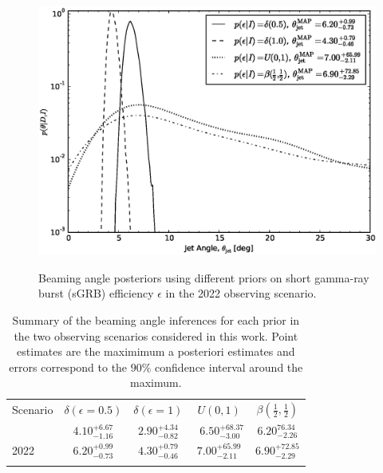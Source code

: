 \documentclass[twocolumn,nofootinbib]{revtex4-1}
\def\sgrb#1{short gamma-ray burst#1 (sGRB#1)\gdef\sgrb{sGRB}}
\begin{document}
\begin{figure}
\centering
{\includegraphics[width=\linewidth]{jet_angle_posterior_aligo_2022_re_real.eps}}
\caption{Beaming angle posteriors using different priors on \sgrb{} efficiency
$\epsilon$ in the 2022 observing scenario.\label{fig:jetposterior2022}}
\end{figure}

\begin{table}
\centering
\begin{tabular}{l c c c c }
\toprule
Scenario & $\delta(\epsilon=0.5)$ & $\delta(\epsilon=1)$ & $U(0,1)$ & $\beta(\frac{1}{2},\frac{1}{2})$\\
\cline{1-1}\cline{2-5}
\colrule
2016  & $4.10^{+6.67}_{-1.16}$ & $2.90^{+4.34}_{-0.82}$ &\ $6.50^{+68.37}_{-3.00}$ & $6.20^{76.34}_{-2.26}$ \\
2022 & $6.20^{+0.99}_{-0.73}$ & $4.30^{+0.79}_{-0.46}$ & $7.00^{+65.99}_{-2.11}$ & $6.90^{+72.85}_{-2.29}$ \\
\botrule
\end{tabular}
\caption{Summary of the beaming angle inferences for each prior in the two
observing scenarios considered in this work.  Point estimates are the maximimum
a posteriori estimates and errors correspond to the $90\%$ confidence interval
around the maximum.\label{table:aligo_beam_inference}}
\end{table}

%
\end{document}
